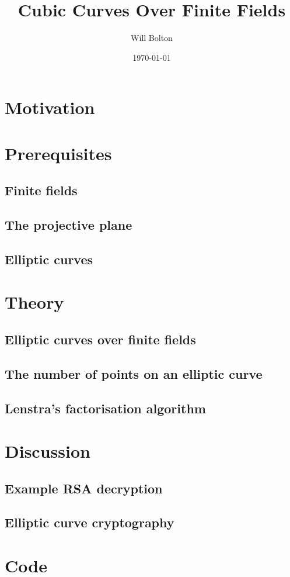 \documentclass[a4paper,12pt,titlepage,oneside]{article}
\title{Cubic Curves Over Finite Fields}
\author{Will Bolton}
\date{\today}
\begin{document}
\maketitle
\tableofcontents
\clearpage

\section*{Motivation}

\nocite{*}
\clearpage

\section{Prerequisites}
\subsection{Finite fields}

\subsection{The projective plane}

\subsection{Elliptic curves}

\clearpage

\section{Theory}
\subsection{Elliptic curves over finite fields}

\subsection{The number of points on an elliptic curve}

\subsection{Lenstra's factorisation algorithm}

\clearpage

\section{Discussion}
\subsection{Example RSA decryption}

\subsection{Elliptic curve cryptography}

\clearpage

\appendix
\section{Code}
\label{codeappendix}

\clearpage


\end{document}
